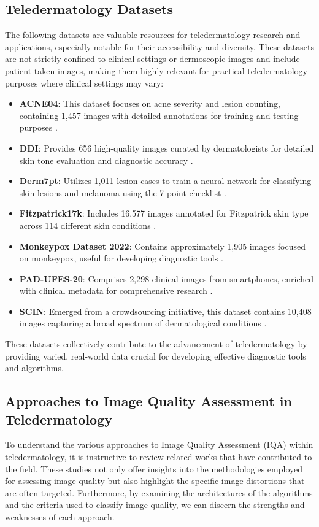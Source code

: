 \subsection{Teledermatology Datasets}
\label{sub:DatasetsTD}
The following datasets are valuable resources for teledermatology research and applications, especially notable for their accessibility and diversity. These datasets are not strictly confined to clinical settings or dermoscopic images and include patient-taken images, making them highly relevant for practical teledermatology purposes where clinical settings may vary:
\begin{itemize}
    \item \textbf{ACNE04}: This dataset focuses on acne severity and lesion counting, containing 1,457 images with detailed annotations for training and testing purposes \autocite{ACNE04}.
    \item \textbf{DDI}: Provides 656 high-quality images curated by dermatologists for detailed skin tone evaluation and diagnostic accuracy \autocite{DDI}.
    \item \textbf{Derm7pt}: Utilizes 1,011 lesion cases to train a neural network for classifying skin lesions and melanoma using the 7-point checklist \autocite{Derm7pt}.
    \item \textbf{Fitzpatrick17k}: Includes 16,577 images annotated for Fitzpatrick skin type across 114 different skin conditions \autocite{F17K}.
    \item \textbf{Monkeypox Dataset 2022}: Contains approximately 1,905 images focused on monkeypox, useful for developing diagnostic tools \autocite{Monkeypox}.
    \item \textbf{PAD-UFES-20}: Comprises 2,298 clinical images from smartphones, enriched with clinical metadata for comprehensive research \autocite{PAD-UFES-20}.
    \item \textbf{SCIN}: Emerged from a crowdsourcing initiative, this dataset contains 10,408 images capturing a broad spectrum of dermatological conditions \autocite{SCIN}.
\end{itemize}
\vspace{\baselineskip}
\noindent
These datasets collectively contribute to the advancement of teledermatology by providing varied, real-world data crucial for developing effective diagnostic tools and algorithms. \par 

\subsection{Approaches to Image Quality Assessment in Teledermatology}
\label{sub:ApproachesIQAinTeledermatology}
To understand the various approaches to Image Quality Assessment (IQA) within teledermatology, it is instructive to review related works that have contributed to the field. These studies not only offer insights into the methodologies employed for assessing image quality but also highlight the specific image distortions that are often targeted. Furthermore, by examining the architectures of the algorithms and the criteria used to classify image quality, we can discern the strengths and weaknesses of each approach. \par

